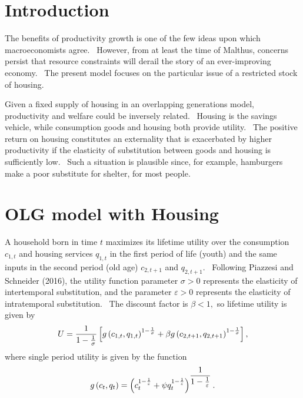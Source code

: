 \documentclass{article}
\begin{document}
\begin{doublespace}%

\section{Introduction}

The benefits of productivity growth is one of the few ideas upon which
macroeconomists agree. \ However, from at least the time of Malthus,
concerns persist that resource constraints will derail the story of an
ever-improving economy. \ The present model focuses on the particular issue
of a restricted stock of housing.

Given a fixed supply of housing in an overlapping generations model,
productivity and welfare could be inversely related. \ Housing is the
savings vehicle, while consumption goods and housing both provide utility. \
The positive return on housing constitutes an externality that is
exacerbated by higher productivity if the elasticity of substitution between
goods and housing is sufficiently low. \ Such a situation is plausible
since, for example, hamburgers make a poor substitute for shelter, for most
people. \ 

\section{OLG model with Housing}

A household born in time $t$ maximizes its lifetime utility over the
consumption $c_{1,t}$ and housing services $q_{1,t}$ in the first period of
life (youth) and the same inputs in the second period (old age) $c_{2,t+1}$
and $q_{2,t+1}.$ \ Following Piazzesi and Schneider (2016), the utility
function parameter $\sigma >0$ represents the elasticity of intertemporal
substitution, and the parameter $\varepsilon >0$ represents the elasticity
of intratemporal substitution. \ The discount factor is $\beta <1,$ so
lifetime utility is given by 
\begin{equation}
U=\frac{1}{1-\frac{1}{\sigma }}\left[ g\left( c_{1,t},q_{1,t}\right) ^{1-%
\frac{1}{\sigma }}+\beta g\left( c_{2,t+1},q_{2,t+1}\right) ^{1-\frac{1}{%
\sigma }}\right] ,  \label{life U}
\end{equation}%
where single period utility is given by the function%
\begin{equation}
g\left( c_{t},q_{t}\right) =\left( c_{t}^{1-\frac{1}{\varepsilon }}+\psi
q_{t}^{1-\frac{1}{\varepsilon }}\right) ^{\dfrac{1}{1-\frac{1}{\varepsilon }}%
}.  \notag
\end{equation}


\end{doublespace}
\end{document}
